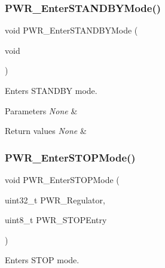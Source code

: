 \subsubsection{\texorpdfstring{PWR\_EnterSTANDBYMode()}{PWR\_EnterSTANDBYMode()}}
{\footnotesize\ttfamily void P\+W\+R\+\_\+\+Enter\+S\+T\+A\+N\+D\+B\+Y\+Mode (\begin{DoxyParamCaption}\item[{void}]{ }\end{DoxyParamCaption})}



Enters S\+T\+A\+N\+D\+BY mode. 


\begin{DoxyParams}{Parameters}
{\em None} & \\
\hline
\end{DoxyParams}

\begin{DoxyRetVals}{Return values}
{\em None} & \\
\hline
\end{DoxyRetVals}
\mbox{\label{group___p_w_r___exported___functions_ga694676ac06a9baf50eae45adae0118ab}} 
\subsubsection{\texorpdfstring{PWR\_EnterSTOPMode()}{PWR\_EnterSTOPMode()}}
{\footnotesize\ttfamily void P\+W\+R\+\_\+\+Enter\+S\+T\+O\+P\+Mode (\begin{DoxyParamCaption}\item[{uint32\+\_\+t}]{P\+W\+R\+\_\+\+Regulator,  }\item[{uint8\+\_\+t}]{P\+W\+R\+\_\+\+S\+T\+O\+P\+Entry }\end{DoxyParamCaption})}



Enters S\+T\+OP mode. 


